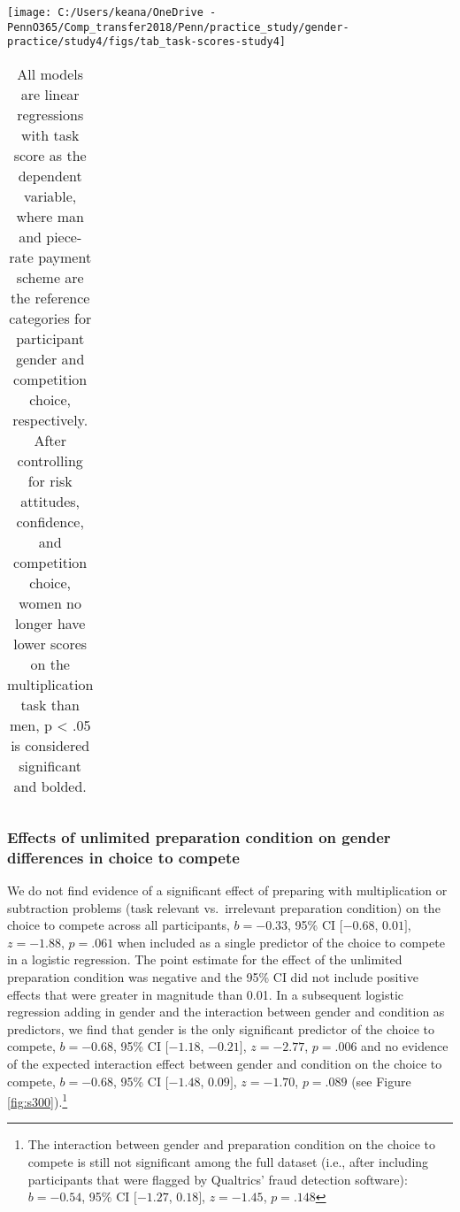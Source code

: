 \documentclass[letterpaper, nobind]{templates/ociamthesis}
\begin{document}
\begin{center}\texttt{[image: C:/Users/keana/OneDrive - PennO365/Comp\_transfer2018/Penn/practice\_study/gender-practice/study4/figs/tab\_task-scores-study4]} \end{center}

\begin{table}[ht]
\centering
\begingroup\fontsize{0.1pt}{0.1pt}\selectfont
\begin{tabular}{r}
   \\ 
 \end{tabular}
\endgroup
\caption{All models are linear regressions with task score as the dependent variable, where man and piece-rate payment scheme are the reference categories for participant gender and competition choice, respectively. After controlling for risk attitudes, confidence, and competition choice, women no longer have lower scores on the multiplication task than men, p < .05 is considered significant and bolded.} 
\label{tab:tab-task-scores-study4}
\end{table}

\hypertarget{effects-of-unlimited-preparation-condition-on-gender-differences-in-choice-to-compete}{%
\subsubsection{Effects of unlimited preparation condition on gender differences in choice to compete}\label{effects-of-unlimited-preparation-condition-on-gender-differences-in-choice-to-compete}}

We do not find evidence of a significant effect of preparing with multiplication or subtraction problems (task relevant vs.~irrelevant preparation condition) on the choice to compete across all participants, \(b = -0.33\), 95\% CI \([-0.68\), \(0.01]\), \(z = -1.88\), \(p = .061\) when included as a single predictor of the choice to compete in a logistic regression. The point estimate for the effect of the unlimited preparation condition was negative and the 95\% CI did not include positive effects that were greater in magnitude than 0.01. In a subsequent logistic regression adding in gender and the interaction between gender and condition as predictors, we find that gender is the only significant predictor of the choice to compete, \(b = -0.68\), 95\% CI \([-1.18\), \(-0.21]\), \(z = -2.77\), \(p = .006\) and no evidence of the expected interaction effect between gender and condition on the choice to compete, \(b = -0.68\), 95\% CI \([-1.48\), \(0.09]\), \(z = -1.70\), \(p = .089\) (see Figure \ref{fig:s300}).\footnote{The interaction between gender and preparation condition on the choice to compete is still not significant among the full dataset (i.e., after including participants that were flagged by Qualtrics' fraud detection software): \(b = -0.54\), 95\% CI \([-1.27\), \(0.18]\), \(z = -1.45\), \(p = .148\)}
\end{document}
